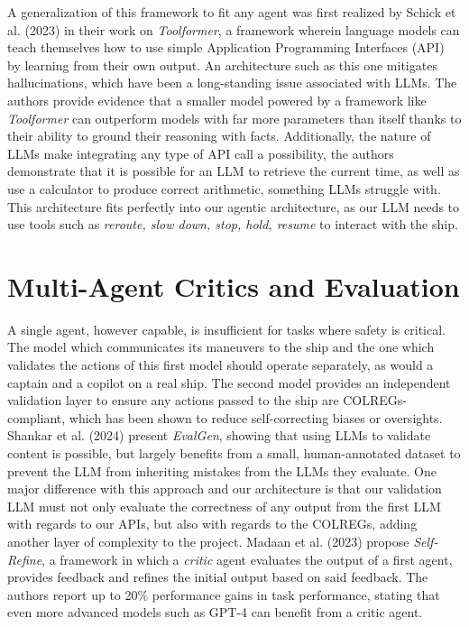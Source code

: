 \documentclass[10pt]{reportMaster}
\begin{document}
A generalization of this framework to fit any agent was first realized by Schick et al. (2023) in their work on \textit{Toolformer}\cite{schick2023toolformerlanguagemodelsteach}, a framework wherein language models can teach themselves how to use simple Application Programming Interfaces (API) by learning from their own output. An architecture such as this one mitigates hallucinations, which have been a long-standing issue associated with LLMs\cite{maynez2020faithfulnessfactualityabstractivesummarization, kalai2025languagemodelshallucinate}. The authors provide evidence that a smaller model powered by a framework like \textit{Toolformer} can outperform models with far more parameters than itself thanks to their ability to ground their reasoning with facts. Additionally, the nature of LLMs make integrating any type of API call a possibility, the authors demonstrate that it is possible for an LLM to retrieve the current time, as well as use a calculator to produce correct arithmetic, something LLMs struggle with. This architecture fits perfectly into our agentic architecture, as our LLM needs to use tools such as \textit{reroute, slow down, stop, hold, resume} to interact with the ship.

\section{Multi-Agent Critics and Evaluation}

A single agent, however capable, is insufficient for tasks where safety is critical. The model which communicates its maneuvers to the ship and the one which validates the actions of this first model should operate separately, as would a captain and a copilot on a real ship. The second model provides an independent validation layer to ensure any actions passed to the ship are COLREGs-compliant, which has been shown to reduce self-correcting biases or oversights\cite{li2024llmsasjudgescomprehensivesurveyllmbased}. Shankar et al. (2024) present \textit{EvalGen}, showing that using LLMs to validate content is possible, but largely benefits from a small, human-annotated dataset to prevent the LLM from inheriting mistakes from the LLMs they evaluate\cite{Shankar_Zamfirescu-Pereira_Hartmann_Parameswaran_Arawjo_2024}. One major difference with this approach and our architecture is that our validation LLM must not only evaluate the correctness of any output from the first LLM with regards to our APIs, but also with regards to the COLREGs, adding another layer of complexity to the project. Madaan et al. (2023) propose \textit{Self-Refine}, a framework in which a \textit{critic} agent evaluates the output of a first agent, provides feedback and refines the initial output based on said feedback. The authors report up to 20\% performance gains in task performance, stating that even more advanced models such as GPT-4 can benefit from a critic agent. 
\end{document}
